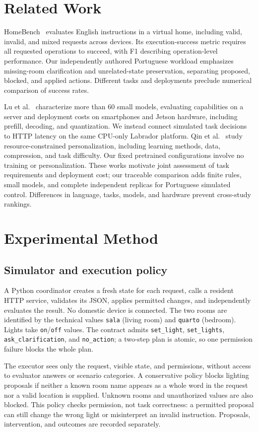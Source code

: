 \documentclass[letterpaper,conference]{IEEEtran}
\begin{document}
\section{Related Work}
HomeBench~\cite{homebench} evaluates English instructions in a virtual home, including valid, invalid, and mixed requests across devices. Its execution-success metric requires all requested operations to succeed, with F1 describing operation-level performance. Our independently authored Portuguese workload emphasizes missing-room clarification and unrelated-state preservation, separating proposed, blocked, and applied actions. Different tasks and deployments preclude numerical comparison of success rates.

Lu et al.~\cite{edge} characterize more than 60 small models, evaluating capabilities on a server and deployment costs on smartphones and Jetson hardware, including prefill, decoding, and quantization. We instead connect simulated task decisions to HTTP latency on the same CPU-only Labrador platform. Qin et al.~\cite{empirical} study resource-constrained personalization, including learning methods, data, compression, and task difficulty. Our fixed pretrained configurations involve no training or personalization. These works motivate joint assessment of task requirements and deployment cost; our traceable comparison adds finite rules, small models, and complete independent replicas for Portuguese simulated control. Differences in language, tasks, models, and hardware prevent cross-study rankings.

\section{Experimental Method}
\subsection{Simulator and execution policy}
A Python coordinator creates a fresh state for each request, calls a resident HTTP service, validates its JSON, applies permitted changes, and independently evaluates the result. No domestic device is connected. The two rooms are identified by the technical values \texttt{sala} (living room) and \texttt{quarto} (bedroom). Lights take \texttt{on}/\texttt{off} values. The contract admits \texttt{set\_light}, \texttt{set\_lights}, \texttt{ask\_clarification}, and \texttt{no\_action}; a two-step plan is atomic, so one permission failure blocks the whole plan.

The executor sees only the request, visible state, and permissions, without access to evaluator answers or scenario categories. A conservative policy blocks lighting proposals if neither a known room name appears as a whole word in the request nor a valid location is supplied. Unknown rooms and unauthorized values are also blocked. This policy checks permission, not task correctness: a permitted proposal can still change the wrong light or misinterpret an invalid instruction. Proposals, intervention, and outcomes are recorded separately.
\end{document}
